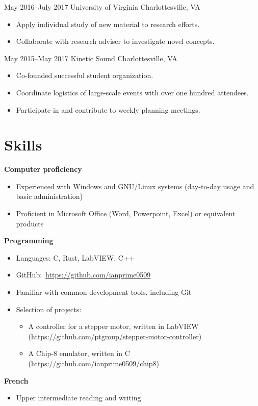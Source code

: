 \documentclass[10pt]{article}
\begin{document}
{May 2016--July 2017}
{University of Virginia}
{Charlottesville, VA}
\begin{itemize}
\item Apply individual study of new material to research efforts.
\item Collaborate with research adviser to investigate novel concepts.
\end{itemize}

{May 2015--May 2017}
{Kinetic Sound}
{Charlottesville, VA}
\begin{itemize}
\item Co-founded successful student organization.
\item Coordinate logistics of large-scale events with over one hundred attendees.
\item Participate in and contribute to weekly planning meetings.
\end{itemize}

\section*{Skills}
\textbf{Computer proficiency}
\begin{itemize}
\item Experienced with Windows and GNU/Linux systems (day-to-day usage and
  basic administration)
\item Proficient in Microsoft Office (Word, Powerpoint, Excel) or equivalent
  products
\end{itemize}
\textbf{Programming}
\begin{itemize}
\item Languages: C, Rust, LabVIEW, C++
\item GitHub:~\url{https://github.com/ianprime0509}
\item Familiar with common development tools, including Git
\item Selection of projects:
  \begin{itemize}
  \item A controller for a stepper motor, written in LabVIEW
    (\url{https://github.com/ptgroup/stepper-motor-controller})
  \item A Chip-8 emulator, written in C
    (\url{https://github.com/ianprime0509/chip8})
  \end{itemize}
\end{itemize}
\textbf{French}
\begin{itemize}
\item Upper intermediate reading and writing
\end{itemize}
\end{document}
